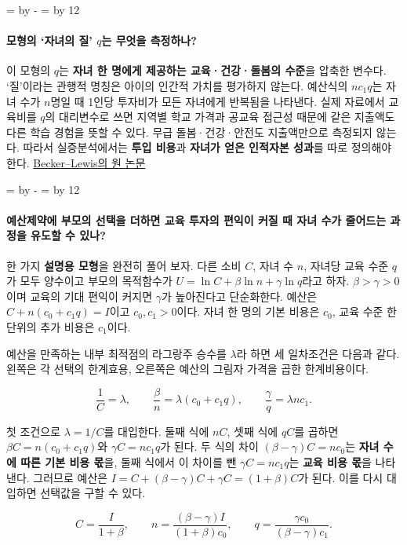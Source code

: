 \documentclass[10pt,a4paper]{article}
\newcommand{\ReserveQuestionSpace}{%
  \par\begingroup
  \dimen0=\pagegoal \advance\dimen0 by -\pagetotal
  \dimen2=\baselineskip \multiply\dimen2 by 12
  \ifdim\dimen0<\dimen2 \newpage\fi
  \endgroup}
\begin{document}
\ReserveQuestionSpace
\paragraph{모형의 ‘자녀의 질’ $q$는 무엇을 측정하나?}
이 모형의 $q$는 \textbf{자녀 한 명에게 제공하는 교육·건강·돌봄의 수준}을 압축한 변수다. ‘질’이라는 관행적 명칭은 아이의 인간적 가치를 평가하지 않는다. 예산식의 $nc_1q$는 자녀 수가 $n$명일 때 1인당 투자비가 모든 자녀에게 반복됨을 나타낸다. 실제 자료에서 교육비를 $q$의 대리변수로 쓰면 지역별 학교 가격과 공교육 접근성 때문에 같은 지출액도 다른 학습 경험을 뜻할 수 있다. 무급 돌봄·건강·안전도 지출액만으로 측정되지 않는다. 따라서 실증분석에서는 \textbf{투입 비용}과 \textbf{자녀가 얻은 인적자본 성과}를 따로 정의해야 한다. \href{https://www.journals.uchicago.edu/doi/abs/10.1086/260166}{Becker–Lewis의 원 논문}\par

\ReserveQuestionSpace
\paragraph{예산제약에 부모의 선택을 더하면 교육 투자의 편익이 커질 때 자녀 수가 줄어드는 과정을 유도할 수 있나?}
한 가지 \textbf{설명용 모형}을 완전히 풀어 보자. 다른 소비 $C$, 자녀 수 $n$, 자녀당 교육 수준 $q$가 모두 양수이고 부모의 목적함수가 $U=\ln C+\beta\ln n+\gamma\ln q$라고 하자. $\beta>\gamma>0$이며 교육의 기대 편익이 커지면 $\gamma$가 높아진다고 단순화한다. 예산은 $C+n(c_0+c_1q)=I$이고 $c_0,c_1>0$이다. 자녀 한 명의 기본 비용은 $c_0$, 교육 수준 한 단위의 추가 비용은 $c_1$이다.\par

예산을 만족하는 내부 최적점의 라그랑주 승수를 $\lambda$라 하면 세 일차조건은 다음과 같다. 왼쪽은 각 선택의 한계효용, 오른쪽은 예산의 그림자 가격을 곱한 한계비용이다.\par

\[
\frac{1}{C}=\lambda,\qquad
\frac{\beta}{n}=\lambda(c_0+c_1q),\qquad
\frac{\gamma}{q}=\lambda n c_1.
\]

첫 조건으로 $\lambda=1/C$를 대입한다. 둘째 식에 $nC$, 셋째 식에 $qC$를 곱하면 $\beta C=n(c_0+c_1q)$와 $\gamma C=nc_1q$가 된다. 두 식의 차이 $(\beta-\gamma)C=nc_0$는 \textbf{자녀 수에 따른 기본 비용 몫}을, 둘째 식에서 이 차이를 뺀 $\gamma C=nc_1q$는 \textbf{교육 비용 몫}을 나타낸다. 그러므로 예산은 $I=C+(\beta-\gamma)C+\gamma C=(1+\beta)C$가 된다. 이를 다시 대입하면 선택값을 구할 수 있다.\par

\[
C=\frac{I}{1+\beta},\qquad
n=\frac{(\beta-\gamma)I}{(1+\beta)c_0},\qquad
q=\frac{\gamma c_0}{(\beta-\gamma)c_1}.
\]
\end{document}

